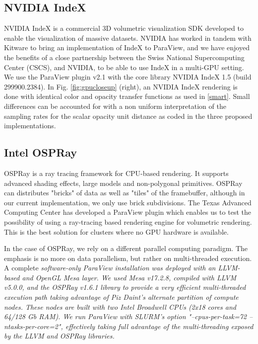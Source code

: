 \documentclass[final,5p,times,twocolumn]{elsarticle}
\begin{document}
\subsection{NVIDIA IndeX} \label{index}

NVIDIA IndeX \cite{NVIDIAIndeX} is a commercial 3D volumetric visualization SDK developed to enable
the visualization of massive datasets. NVIDIA has worked in tandem with Kitware to
bring an implementation of IndeX to ParaView, and we have enjoyed the benefits
of a close partnership between the Swiss National Supercomputing Center (CSCS),
and NVIDIA, to be able to use IndeX in a multi-GPU setting. We use the ParaView
plugin v2.1 with the core library NVIDIA IndeX 1.5 (build 299900.2384). In
Fig. \ref{fig:gpucloseup} (right), an NVIDIA IndeX rendering is done with identical
color and opacity transfer functions as used in \ref{smart}.
Small differences can be accounted for with a non uniform interpretation of the sampling rates
for the scalar opacity unit distance as coded in the three proposed implementations.

\subsection{Intel OSPRay}

OSPRay \cite{OSPRay} is a ray tracing framework for CPU-based rendering. It supports advanced 
shading effects, large models and non-polygonal primitives. OSPRay can distributes 
"bricks" of data as well as "tiles" of the framebuffer, although in our current
implementation, we only use brick subdivisions. The Texas Advanced Computing Center
has developed a ParaView plugin which enables us to test the possibility of
using a ray-tracing based rendering engine for volumetric rendering. This is
the best solution for clusters where no GPU hardware is available.

In the case of OSPRay, we rely on a different parallel computing paradigm.
The emphasis is no more on data parallelism, but rather on multi-threaded execution.
A complete \it{software-only} \rm ParaView installation was deployed with an LLVM-based and
OpenGL Mesa layer. We used Mesa v17.2.8, compiled with LLVM v5.0.0, and the
OSPRay v1.6.1 library to provide a very efficient multi-threaded execution path
taking advantage of Piz Daint's alternate partition of compute nodes. These nodes
are built with two Intel Broadwell CPUs (2x18 cores and 64/128 Gb RAM). We run
ParaView with SLURM's option "--cpus-per-task=72 --ntasks-per-core=2", effectively
taking full advantage of the multi-threading exposed by the LLVM and OSPRay libraries. 
\end{document}

